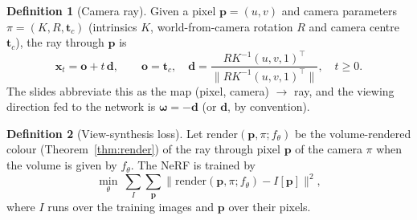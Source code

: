 \documentclass[11pt,a4paper]{article}
\newcommand{\xx}{\boldsymbol{x}}
\newcommand{\om}{\boldsymbol{\omega}}
\newcommand{\dd}{\boldsymbol{d}}
\theoremstyle{definition}
\newtheorem{definition}{Definition}[section]
\theoremstyle{plain}
\begin{document}
\begin{definition}[Camera ray]
Given a pixel $\boldsymbol p=(u,v)$ and camera parameters $\pi=(K,R,\boldsymbol t_c)$ (intrinsics $K$, world-from-camera rotation $R$ and camera centre $\boldsymbol t_c$), the ray through $\boldsymbol p$ is
\[
\xx_t=\boldsymbol o+t\,\dd,\qquad \boldsymbol o=\boldsymbol t_c,\quad \dd=\frac{RK^{-1}(u,v,1)^\top}{\|RK^{-1}(u,v,1)^\top\|},\quad t\ge0 .
\]
The slides abbreviate this as the map (pixel, camera) $\to$ ray, and the viewing direction fed to the network is $\om=-\dd$ (or $\dd$, by convention).
\end{definition}

\begin{definition}[View-synthesis loss]
Let $\mathrm{render}(\boldsymbol p,\pi;f_\theta)$ be the volume-rendered colour (Theorem~\ref{thm:render}) of the ray through pixel $\boldsymbol p$ of the camera $\pi$ when the volume is given by $f_\theta$. The NeRF is trained by
\[
\min_\theta\ \sum_{I}\sum_{\boldsymbol p}\big\|\mathrm{render}(\boldsymbol p,\pi;f_\theta)-I[\boldsymbol p]\big\|^2 ,
\]
where $I$ runs over the training images and $\boldsymbol p$ over their pixels.
\end{definition}
\end{document}

